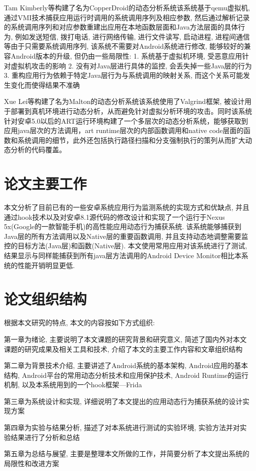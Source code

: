 Tam Kimberly等构建了名为CopperDroid的动态分析系统\juhao 该系统基于qemu虚拟机, 通过VMI技术捕获应用运行时调用的系统调用序列及相应参数, 然后通过解析记录的系统调用序列和对应参数重建出应用在本地函数层面和Java方法层面的具体行为, 例如发送短信, 拨打电话, 进行网络传输, 进行文件读写, 启动进程, 进程间通信等\juhao 由于只需要系统调用序列, 该系统不需要对Android系统进行修改, 能够较好的兼容Android版本的升级, 但仍由一些局限性:
1. 系统基于虚拟机环境, 受恶意应用针对虚拟机攻击的影响
2. 没有对Java层进行具体的监控, 会丢失掉一些Java层的行为
3. 重构应用行为依赖于特定Java层行为与系统调用的映射关系, 而这个关系可能发生变化而使得结果不准确

Xue Lei等构建了名为Malton的动态分析系统\juhao 该系统使用了Valgrind框架, 被设计用于部署到真机环境进行动态分析，从而避免针对虚拟分析环境的攻击。同时该系统针对安卓5.0以后的ART运行环境构建了一个多层次的动态分析系统，能够获取到应用java层次的方法调用，art runtime层次的内部函数调用和native code层面的函数和系统调用的细节，此外还包括执行路径扫描和分支强制执行的策列从而扩大动态分析的代码覆盖。


\section{论文主要工作}
本文分析了目前已有的一些安卓系统应用行为监测系统的实现方式和优缺点, 并且通过hook技术以及对安卓8.1源代码的修改设计和实现了一个运行于Nexus 5x(Google的一款智能手机)的高性能应用动态行为捕获系统. 该系统能够捕获到Java层的所有方法调用以及Native层的重要函数调用, 并且支持动态地调整需要监控的目标方法(Java层)和函数(Native层). 本文使用常用应用对该系统进行了测试, 结果显示与同样能捕获到所有java层方法调用的Android Device Monitor相比本系统的性能开销明显更低.

\section{论文组织结构}
根据本文研究的特点, 本文的内容按如下方式组织:

第一章为绪论, 主要说明了本文课题的研究背景和研究意义, 简述了国内外对本文课题的研究成果及相关工具和技术, 介绍了本文的主要工作内容和文章组织结构\juhao 

第二章为背景技术介绍, 主要讲述了Android系统的基本架构, Android应用的基本结构, Android平台的常用动态分析技术和应用保护技术, Android Runtime的运行机制, 以及本系统用到的一个hook框架---Frida\juhao

第三章为系统设计和实现, 详细说明了本文提出的应用动态行为捕获系统的设计实现方案\juhao

第四章为实验与结果分析, 描述了对本系统进行测试的实验环境, 实验方法并对实验结果进行了分析和总结\juhao

第五章为总结与展望, 主要是整理本文所做的工作，并简要分析了本文提出系统的局限性和改进方案\juhao

 